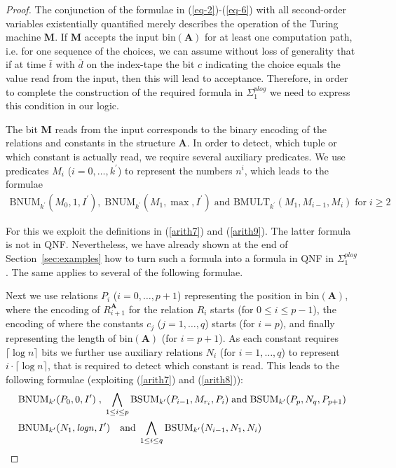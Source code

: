 \documentclass{article}
\begin{document}
\begin{proof}
The conjunction of the formulae in (\ref{eq-2})-(\ref{eq-6}) with all second-order variables existentially quantified merely describes the operation of the Turing machine \textbf{M}. If \textbf{M} accepts the input $\mathrm{bin}(\textbf{A})$ for at least one computation path, i.e. for one sequence of the choices, we can assume without loss of generality that if at time $\bar{t}$ with $\bar{d}$ on the index-tape the bit $c$ indicating the choice equals the value read from the input, then this will lead to acceptance. Therefore, in order to complete the construction of the required formula in $\Sigma^{\mathit{plog}}_1$ we need to express this condition in our logic.

The bit \textbf{M} reads from the input corresponds to the binary encoding of the relations and constants in the structure $\mathbf{A}$. In order to detect, which tuple or which constant is actually read, we require several auxiliary predicates. We use predicates $M_i$ ($i=0, \dots, k^\prime$) to represent the numbers $n^i$, which leads to the formulae
\begin{gather}
\mathrm{BNUM}_{k^\prime}(M_0,1,I^\prime),\;\mathrm{BNUM}_{k^\prime}(M_1,\max,I^\prime) \;\text{and }
 \mathrm{BMULT}_{k^\prime}(M_1,M_{i-1},M_i) \;\text{for}\; i \ge 2 \label{eq-7}
\end{gather}

For this we exploit the definitions in (\ref{arith7}) and (\ref{arith9}). The latter formula is not in QNF. Nevertheless, we have already shown at the end of Section~\ref{sec:examples} how to turn such a formula into a formula in QNF in $\Sigma^{\mathit{plog}}_1$. The same applies to several of the following formulae.

Next we use relations $P_i$ ($i=0,\dots,p+1$) representing the position in $\mathrm{bin}(\textbf{A})$, where the encoding of $R_{i+1}^{\mathbf{A}}$ for the relation $R_i$ starts (for $0 \le i \le p-1$), the encoding of where the constants $c_j$ ($j=1,\dots,q$) starts (for $i=p$), and finally representing the length of $\mathrm{bin}(\textbf{A})$ (for $i=p+1$). As each constant requires $\lceil \log n \rceil$ bits we further use auxiliary relations $N_i$ (for $i=1,\dots,q$) to represent $i \cdot \lceil \log n \rceil$, that is required to detect which constant is read. This leads to the following formulae (exploiting (\ref{arith7}) and (\ref{arith8})):
\begin{align}
& \mathrm{BNUM}_{k^\prime}(P_0,0,I^\prime) \; , \; \bigwedge_{1 \le i \le p} \mathrm{BSUM}_{k^\prime}(P_{i-1},M_{r_i},P_i) \; \text{and} \; \mathrm{BSUM}_{k^\prime}(P_p,N_q,P_{p+1}) \notag \\
& \mathrm{BNUM}_{k^\prime}(N_1,\mathit{logn},I^\prime) \quad \text{and} \; \bigwedge_{1 \le i \le q} \mathrm{BSUM}_{k^\prime}(N_{i-1},N_1,N_i) \label{eq-8}
\end{align}


\end{proof}
\end{document}
